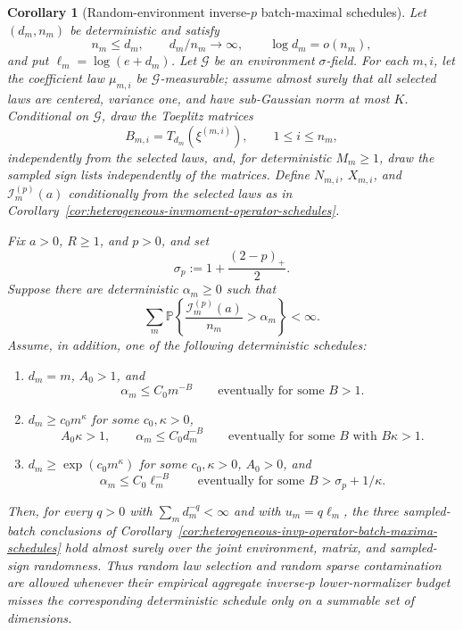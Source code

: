 \documentclass[11pt]{amsart}
\numberwithin{equation}{section}
\newtheorem{corollary}[theorem]{Corollary}
\theoremstyle{definition}
\theoremstyle{remark}
\newcommand{\Prob}{\mathbb P}
\begin{document}
\begin{corollary}[Random-environment inverse-\(p\) batch-maximal schedules]
\label{cor:random-environment-invp-operator-batch-maxima-schedules}
Let \((d_m,n_m)\) be deterministic and satisfy
\[
  n_m\le d_m,\qquad d_m/n_m\to\infty,\qquad \log d_m=o(n_m),
\]
and put \(\ell_m=\log(e+d_m)\).  Let \(\mathcal G\) be an environment
\(\sigma\)-field.  For each \(m,i\), let the coefficient law
\(\mu_{m,i}\) be \(\mathcal G\)-measurable; assume almost surely that all
selected laws are centered, variance one, and have sub-Gaussian norm at most
\(K\).  Conditional on \(\mathcal G\), draw the Toeplitz matrices
\[
  B_{m,i}=T_{d_m}(\xi^{(m,i)}),\qquad 1\le i\le n_m,
\]
independently from the selected laws, and, for deterministic \(M_m\ge1\), draw
the sampled sign lists independently of the matrices.  Define \(N_{m,i}\),
\(X_{m,i}\), and
\(\mathcal I_m^{(p)}(a)\) conditionally from the selected laws as in
Corollary~\ref{cor:heterogeneous-invmoment-operator-schedules}.

Fix \(a>0\), \(R\ge1\), and \(p>0\), and set
\[
  \sigma_p:=1+\frac{(2-p)_+}{2}.
\]
Suppose there are deterministic \(\alpha_m\ge0\) such that
\[
  \sum_m
  \Prob\left\{
    \frac{\mathcal I_m^{(p)}(a)}{n_m}>\alpha_m
  \right\}<\infty .
\]
Assume, in addition, one of the following deterministic schedules:
\begin{enumerate}[label=\textup{(\roman*)},leftmargin=2.2em]
\item \(d_m=m\), \(A_0>1\), and
\[
  \alpha_m\le C_0m^{-B}
  \qquad\text{eventually for some }B>1.
\]
\item \(d_m\ge c_0m^\kappa\) for some \(c_0,\kappa>0\),
\[
  A_0\kappa>1,
  \qquad
  \alpha_m\le C_0d_m^{-B}
  \qquad\text{eventually for some }B\text{ with }B\kappa>1.
\]
\item \(d_m\ge\exp(c_0m^\kappa)\) for some \(c_0,\kappa>0\), \(A_0>0\), and
\[
  \alpha_m\le C_0\ell_m^{-B}
  \qquad\text{eventually for some }B>\sigma_p+1/\kappa .
\]
\end{enumerate}
Then, for every \(q>0\) with \(\sum_m d_m^{-q}<\infty\) and with
\(u_m=q\ell_m\), the three sampled-batch conclusions of
Corollary~\ref{cor:heterogeneous-invp-operator-batch-maxima-schedules} hold
almost surely over the joint environment, matrix, and sampled-sign randomness.
Thus random law selection and random sparse contamination are allowed whenever
their empirical aggregate inverse-\(p\) lower-normalizer budget misses the
corresponding deterministic schedule only on a summable set of dimensions.
\end{corollary}
\end{document}
